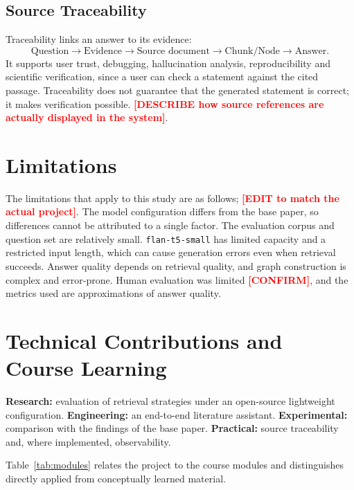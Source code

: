 \documentclass[conference]{IEEEtran}
\newcommand{\ph}[1]{\textbf{\textcolor{red}{[#1]}}}
\begin{document}
\subsection{Source Traceability}
Traceability links an answer to its evidence:
\begin{equation*}
\text{Question}\rightarrow\text{Evidence}\rightarrow\text{Source document}\rightarrow\text{Chunk/Node}\rightarrow\text{Answer}.
\end{equation*}
It supports user trust, debugging, hallucination analysis, reproducibility and scientific verification, since a user can check a statement against the cited passage. Traceability does not guarantee that the generated statement is correct; it makes verification possible. \ph{DESCRIBE how source references are actually displayed in the system}.

\section{Limitations}
The limitations that apply to this study are as follows; \ph{EDIT to match the actual project}. The model configuration differs from the base paper, so differences cannot be attributed to a single factor. The evaluation corpus and question set are relatively small. \texttt{flan-t5-small} has limited capacity and a restricted input length, which can cause generation errors even when retrieval succeeds. Answer quality depends on retrieval quality, and graph construction is complex and error-prone. Human evaluation was limited \ph{CONFIRM}, and the metrics used are approximations of answer quality.

\section{Technical Contributions and Course Learning}
\textbf{Research:} evaluation of retrieval strategies under an open-source lightweight configuration. \textbf{Engineering:} an end-to-end literature assistant. \textbf{Experimental:} comparison with the findings of the base paper. \textbf{Practical:} source traceability and, where implemented, observability.

Table~\ref{tab:modules} relates the project to the course modules and distinguishes directly applied from conceptually learned material.
\end{document}

